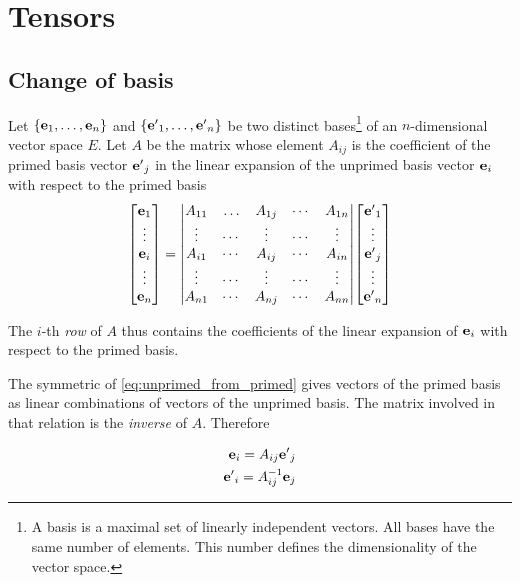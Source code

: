 \appendix
\chapter{Tensors}
\label{ch:Tensors} 

\section{Change of basis}
Let $\{\vb{e}_1, \ldots, \vb{e}_n \}$ and $\{{\vb{e}'}_1, \ldots, {\vb{e}'}_n \}$ be two distinct bases\footnote{A basis is a maximal set of linearly independent vectors. All bases have the same number of elements. This number defines the dimensionality of the vector space.} of an $n$-dimensional vector space $E$.  
Let $A$ be the matrix whose element $A_{ij}$ is the coefficient of the primed basis vector ${\vb{e}'}_j$ in the linear expansion of the unprimed basis vector $\vb{e}_i$ with respect to the primed basis    
\begin{align}
\label{eq:unprimed_from_primed}
\mqty[ \vb{e}_1 \\ \vdots \\ \vb{e}_i \\ \vdots \\ \vb{e}_n ] = \mqty|
A_{11}  &  \ldots  & A_{1j}  &  \cdots  & A_{1n} \\
\vdots  &  \cdots  & \vdots  &  \cdots  & \vdots \\
A_{i1}  &  \cdots  & A_{ij}  &  \cdots  & A_{in} \\
\vdots  &  \cdots  & \vdots  &  \cdots  & \vdots \\
A_{n1}  &  \cdots  & A_{nj}  &  \cdots  & A_{nn} |
\mqty[ {\vb{e}'}_1 \\ \vdots \\ {\vb{e}'}_j \\ \vdots \\ {\vb{e}'}_n ]  
\end{align}

The $i$-th \textit{row} of $A$ thus contains the coefficients of the linear expansion of $\vb{e}_i$ with respect to the primed basis. 

The symmetric of \ref{eq:unprimed_from_primed} gives vectors of the primed basis as linear combinations of vectors of the unprimed basis. The matrix involved in that relation is the \textit{inverse} of $A$. Therefore

\begin{subequations}
\label{eq:twoway_basis_change}
\begin{align}
\vb{e}_i = A_{ij} {\vb{e}'}_j \\ 
{\vb{e}'}_i = A_{ij}^{-1} \vb{e}_j
\end{align}
\end{subequations}

